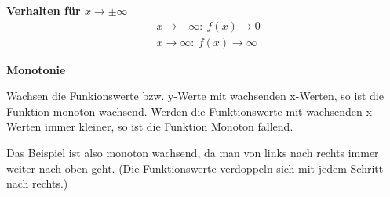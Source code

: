 \medskip

\begin{tcolorbox}
	\textbf{Verhalten für \(x\to \pm\infty\)}
	\textcolor{loestc}{
		\begin{align*}
			&x\to-\infty\colon\ f(x)\to0\\
			&x\to\infty\colon\ f(x)\to\infty
	\end{align*}}
    \vspace{1cm}
\end{tcolorbox}
\begin{tcolorbox}
	\textbf{Monotonie}

	\textcolor{loestc}{Wachsen die Funkionswerte bzw. y-Werte mit wachsenden x-Werten, so ist die Funktion monoton wachsend. Werden die Funktionswerte mit wachsenden x-Werten immer kleiner, so ist die Funktion Monoton fallend.}

	\textcolor{loestc}{Das Beispiel ist also monoton wachsend, da man von links nach rechts immer weiter nach oben geht. (Die Funktionswerte verdoppeln sich mit jedem Schritt nach rechts.)\vspace{3cm}}
\end{tcolorbox}
\newpage
